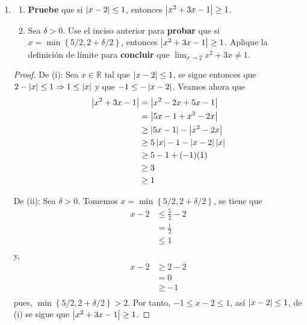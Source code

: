 \documentclass[12pt]{article}
\begin{document}
\begin{enumerate}
    \item \begin{enumerate}
        \item \textbf{Pruebe} que si $\left| x-2 \right|\leq1$, entonces $\left| x^2+3x-1 \right|\geq1$.
        \item Sea $\delta>0$. Use el inciso anterior para \textbf{probar} que si $x=\min\left\{5/2,2+\delta/2 \right\}$, entonces $\left| x^2+3x-1 \right|\geq1$. Aplique la definición de límite para \textbf{concluir} que $\lim_{x\rightarrow2}x^2+3x\neq1$.
    \end{enumerate}

    \begin{proof}
        De (i): Sea $x\in\mathbb{R}$ tal que $\left| x-2 \right|\leq 1$, se sigue entonces que $2-\left| x \right|\leq 1\Rightarrow 1\leq\left| x \right|$ y que $-1\leq-\left| x-2 \right|$. Veamos ahora que
        \begin{equation*}
            \begin{split}
                \left| x^2+3x-1 \right|&=\left| x^2-2x+5x-1 \right|\\
                &=\left| 5x-1+x^2-2x \right|\\
                &\geq\left| 5x-1 \right|-\left| x^2-2x \right|\\
                &\geq5\left| x \right|-1-\left| x-2 \right|\left| x \right|\\
                &\geq5-1+(-1)(1)\\
                &\geq3\\
                &\geq 1\\
            \end{split}
        \end{equation*}

        De (ii): Sea $\delta>0$. Tomemos $x=\min\left\{5/2,2+\delta/2\right\}$, se tiene que
        \begin{equation*}
            \begin{split}
                x-2&\leq\frac{5}{2}-2\\
                &=\frac{1}{2}\\
                &\leq 1\\
            \end{split}
        \end{equation*}
        y,
        \begin{equation*}
            \begin{split}
                x-2&\geq 2-2\\
                &= 0\\
                &\geq -1\\
            \end{split}
        \end{equation*}
        pues, $\min\left\{5/2,2+\delta/2 \right\}>2$. Por tanto, $-1\leq x-2\leq 1$, así $\left| x-2 \right|\leq 1$, de (i) se sigue que $\left| x^2+3x-1 \right|\geq 1$.


\end{proof}
\end{enumerate}
\end{document}

